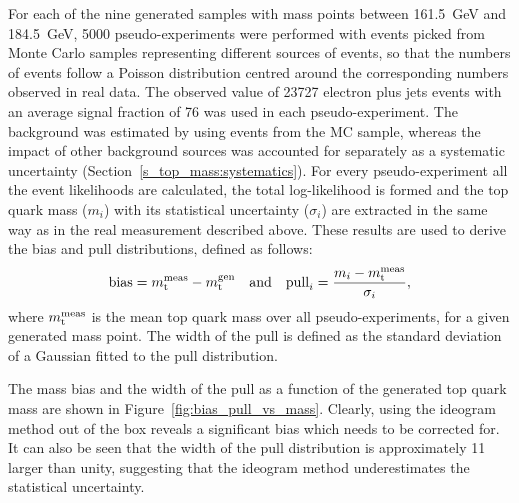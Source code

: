 For each of the nine generated \ttbar samples with mass points between \SI{161.5}{\GeV} and \SI{184.5}{\GeV},
\num{5000} pseudo-experiments were performed with events picked from Monte Carlo samples representing different sources
of events, so that the numbers of events follow a Poisson distribution centred around the corresponding numbers observed
in real data. The observed value of \num{23727} electron plus jets events with an average signal fraction of
\SI{76}{\pc} was used in each pseudo-experiment. The background was estimated by using events from the \WpJets MC
sample, whereas the impact of other background sources was accounted for separately as a systematic uncertainty
(Section~\ref{s_top_mass:systematics}). For every pseudo-experiment all the event likelihoods are calculated, the total
log-likelihood is formed and the top quark mass ($m_i$) with its statistical uncertainty ($\sigma_i$) are extracted in
the same way as in the real measurement described above. These results are used to derive the bias and pull
distributions, defined as follows:
\begin{equation}
 \textrm{bias} = m_\mathrm{t}^{\rm meas} - m_\mathrm{t}^{\rm gen} \quad \text{and} \quad
 \textrm{pull}_i = \frac{m_i - m_\mathrm{t}^{\rm meas}}{\sigma_i},
\label{eq:bias_pull}
\end{equation}
where $m_\mathrm{t}^{\rm meas}$ is the mean top quark mass over all pseudo-experiments, for a given generated mass point. The
width of the pull is defined as the standard deviation of a Gaussian fitted to the pull distribution.

The mass bias and the width of the pull as a function of the generated top quark mass are shown in
Figure~\ref{fig:bias_pull_vs_mass}. Clearly, using the ideogram method out of the box reveals a significant bias which
needs to be corrected for. It can also be seen that the width of the pull distribution is approximately \SI{11}{\pc}
larger than unity, suggesting that the ideogram method underestimates the statistical uncertainty.


